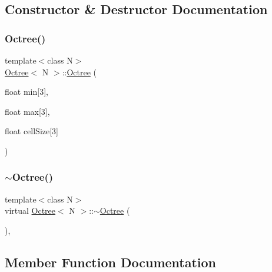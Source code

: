 \subsection{Constructor \& Destructor Documentation}
\mbox{\label{classOctree_aad1a0fd489e7412610b0161cff5da573}} 
\subsubsection{\texorpdfstring{Octree()}{Octree()}}
{\footnotesize\ttfamily template$<$class N$>$ \\
\hyperlink{classOctree}{Octree}$<$ N $>$\+::\hyperlink{classOctree}{Octree} (\begin{DoxyParamCaption}\item[{float}]{min\mbox{[}3\mbox{]},  }\item[{float}]{max\mbox{[}3\mbox{]},  }\item[{float}]{cell\+Size\mbox{[}3\mbox{]} }\end{DoxyParamCaption})\hspace{0.3cm}{\ttfamily [inline]}}

\mbox{\label{classOctree_a7fb8884a9c9147da4020217f58237932}} 
\subsubsection{\texorpdfstring{$\sim$\+Octree()}{~Octree()}}
{\footnotesize\ttfamily template$<$class N$>$ \\
virtual \hyperlink{classOctree}{Octree}$<$ N $>$\+::$\sim$\hyperlink{classOctree}{Octree} (\begin{DoxyParamCaption}{ }\end{DoxyParamCaption})\hspace{0.3cm}{\ttfamily [inline]}, {\ttfamily [virtual]}}



\subsection{Member Function Documentation}
\mbox{\label{classOctree_a4038c20a015dbf6b74fd9ccd76fb80cd}} 
